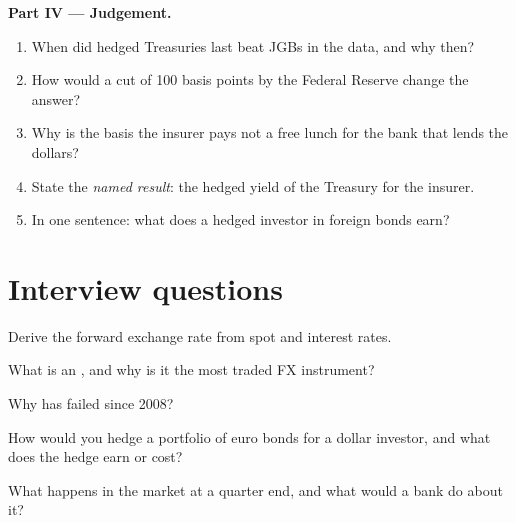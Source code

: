 \begin{problem}
\medskip\noindent\textbf{Part IV --- Judgement.}
\begin{enumerate}[resume]
\item When did hedged Treasuries last beat JGBs in the data, and why then?
\item How would a cut of 100 basis points by the Federal Reserve change the answer?
\item Why is the basis the insurer pays not a free lunch for the bank that lends the dollars?
\item State the \emph{named result}: the hedged yield of the Treasury for the insurer.
\item In one sentence: what does a hedged investor in foreign bonds earn?
\end{enumerate}
\end{problem}

\section{Interview questions}

\begin{interviewq}\label{iq:m2:fx-swaps-forwards-and-the-cross-currency-basis:1}
Derive the forward exchange rate from spot and interest rates.
\end{interviewq}

\begin{interviewq}\label{iq:m2:fx-swaps-forwards-and-the-cross-currency-basis:2}
What is an , and why is it the most traded FX instrument?
\end{interviewq}

\begin{interviewq}\label{iq:m2:fx-swaps-forwards-and-the-cross-currency-basis:3}
Why has  failed since 2008?
\end{interviewq}

\begin{interviewq}\label{iq:m2:fx-swaps-forwards-and-the-cross-currency-basis:4}
How would you hedge a portfolio of euro bonds for a dollar investor, and what
does the hedge earn or cost?
\end{interviewq}

\begin{interviewq}\label{iq:m2:fx-swaps-forwards-and-the-cross-currency-basis:5}
What happens in the  market at a quarter end, and what would a bank do
about it?
\end{interviewq}

